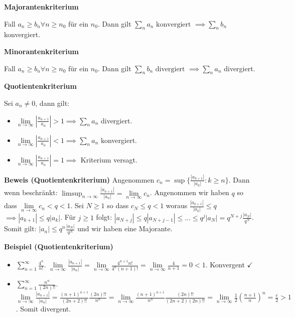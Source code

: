 \documentclass[25pt]{sciposter}
\newcommand{\limm}{\lim\limits_{n \to \infty}}
\newenvironment{method}[1]{\begin{mdframed}[backgroundcolor=blue!10,innertopmargin=15pt, innerbottommargin=15pt, nobreak=true]
		\textbf{#1 }
	}
	{ 
	\end{mdframed}
}
\begin{document}
\begin{multicols}{3}
\begin{method}{Majorantenkriterium}
	Fall $a_n \geq b_n \forall n \geq n_0$ für ein $n_0$. Dann gilt $\sum_n a_n \text{ konvergiert } \implies \sum_{n} b_n$ konvergiert.
\end{method}

\begin{method}{Minorantenkriterium}
	Fall $a_n \geq b_n \forall n \geq n_0$ für ein $n_0$. Dann gilt $\sum_n b_n \text{ divergiert } \implies \sum_{n} a_n$ divergiert.
\end{method}




\begin{method}{Quotientenkriterium}
	Sei $a_n \not = 0$, dann gilt:
	\begin{itemize}
		\item $\lim\limits_{n \to \infty} |\frac{a_{n+1}}{a_n}|> 1 \implies \sum_{n} a_n$ divergiert. 
		\item $\lim\limits_{n \to \infty} |\frac{a_{n+1}}{a_n}|< 1 \implies \sum_{n} a_n$ konvergiert. 
		\item $\lim\limits_{n \to \infty} |\frac{a_{n+1}}{a_n}|=  1 \implies $ Kriterium versagt.
	\end{itemize}
\end{method}

\textbf{Beweis (Quotientenkriterium)} Angenommen $c_n = \sup\{ \frac{|a_{k+1}|}{|a_{k}|} : k \geq n \}$. Dann wenn beschränkt: $\limsup_{n\to \infty} \frac{|a_{n+1}|}{|a_{n}|} = \limm c_n$. Angenommen wir haben $q$ so dass $\limm c_n < q < 1$. Sei $N \geq 1$ so dass $c_N \leq q < 1$ woraus $\frac{|a_{k+1}|}{|a_k|} \leq q$ $\implies |a_{k+1}| \leq q |a_k|$. Für $j\geq 1$ folgt: $|a_{N+j}|\leq q|a_{N+j-1}| \leq \ldots \leq q^j |a_N| = q^{N+j} \frac{|a_N|}{q^N}$. Somit gilt: $|a_n| \leq q^n \frac{|a_N|}{q^N}$ und wir haben eine Majorante.

\textbf{Beispiel (Quotientenkriterium)}

\begin{itemize}
	\item $\sum_{n = 1}^\infty \frac{4^n}{n!}$. $\limm \frac{|a_{n+1}|}{|a_n|} = \limm \frac{4^{n+1} n!}{4^n (n+1)!} = \limm \frac{4}{n+1} = 0 < 1$. Konvergent $\checkmark$
	
	\item $\sum_{n = 1}^\infty \frac{n^n}{(2n)!!}$.  $\limm \frac{|a_{n+1}|}{|a_n|}  = \frac{(n+1)^{n+1}}{(2n+2)!!} \frac{(2n)!!}{n^n} = \limm \frac{(n+1)^{n+1}}{n^n} \frac{(2n)!!}{(2n+2)(2n)!!} = \limm \frac{1}{2} \left( \frac{n+1}{n} \right)^n = \frac{e}{2}>1$. Somit divergent.
\end{itemize}






\end{multicols}
\end{document}
